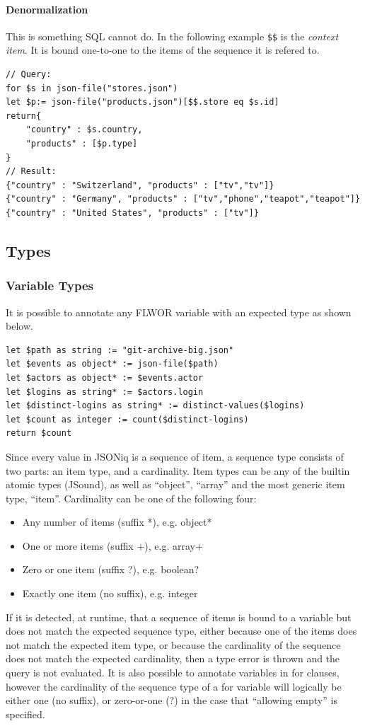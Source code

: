 \paragraph{Denormalization}
This is something SQL cannot do. In the following example \texttt{\$\$} is the \textit{context item}. It is bound one-to-one to the items of the sequence it is refered to.

\begin{lstlisting}[style=json]
// Query:
for $s in json-file("stores.json")
let $p:= json-file("products.json")[$$.store eq $s.id]
return{
    "country" : $s.country,
    "products" : [$p.type]
}
// Result:
{"country" : "Switzerland", "products" : ["tv","tv"]}
{"country" : "Germany", "products" : ["tv","phone","teapot","teapot"]}
{"country" : "United States", "products" : ["tv"]}
\end{lstlisting}

\subsection{Types}

\subsubsection{Variable Types}
It is possible to annotate any FLWOR variable with an expected type as shown below.

\begin{lstlisting}[style=json]
let $path as string := "git-archive-big.json"
let $events as object* := json-file($path)
let $actors as object* := $events.actor
let $logins as string* := $actors.login
let $distinct-logins as string* := distinct-values($logins)
let $count as integer := count($distinct-logins)
return $count
\end{lstlisting}

Since every value in JSONiq is a sequence of item, a sequence type consists of two parts: an item type, and a cardinality.
Item types can be any of the builtin atomic types (JSound), as well as “object”, “array” and the most generic item type, “item”. Cardinality can be one of the following four:
\begin{itemize}
    \item Any number of items (suffix *), e.g. object*
    \item One or more items (suffix +), e.g. array+
    \item Zero or one item (suffix ?), e.g. boolean?
    \item Exactly one item (no suffix), e.g. integer
\end{itemize}
If it is detected, at runtime, that a sequence of items is bound to a variable but does not match the expected sequence type, either because one of the items does not match the expected item type, or because the cardinality of the sequence does not match the expected cardinality, then a type error is thrown and the query is not evaluated.
It is also possible to annotate variables in for clauses, however the cardinality of the sequence type of a for variable will logically be either one (no suffix), or zero-or-one (?) in the case that “allowing empty” is specified.

